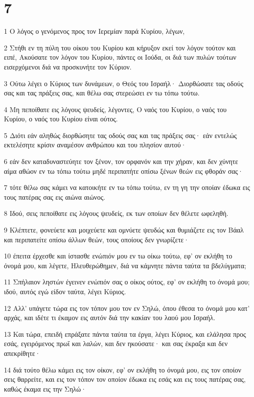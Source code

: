\chapter{7}

\par 1 Ο λόγος ο γενόμενος προς τον Ιερεμίαν παρά Κυρίου, λέγων,
\par 2 Στήθι εν τη πύλη του οίκου του Κυρίου και κήρυξον εκεί τον λόγον τούτον και ειπέ, Ακούσατε τον λόγον του Κυρίου, πάντες οι Ιούδα, οι διά των πυλών τούτων εισερχόμενοι διά να προσκυνήτε τον Κύριον.
\par 3 Ούτω λέγει ο Κύριος των δυνάμεων, ο Θεός του Ισραήλ· Διορθώσατε τας οδούς σας και τας πράξεις σας, και θέλω σας στερεώσει εν τω τόπω τούτω.
\par 4 Μη πεποίθατε εις λόγους ψευδείς, λέγοντες, Ο ναός του Κυρίου, ο ναός του Κυρίου, ο ναός του Κυρίου είναι ούτος.
\par 5 Διότι εάν αληθώς διορθώσητε τας οδούς σας και τας πράξεις σας· εάν εντελώς εκτελέσητε κρίσιν αναμέσον ανθρώπου και του πλησίον αυτού·
\par 6 εάν δεν καταδυναστεύητε τον ξένον, τον ορφανόν και την χήραν, και δεν χύνητε αίμα αθώον εν τω τόπω τούτω μηδέ περιπατήτε οπίσω ξένων θεών εις φθοράν σας·
\par 7 τότε θέλω σας κάμει να κατοικήτε εν τω τόπω τούτω, εν τη γη την οποίαν έδωκα εις τους πατέρας σας εις αιώνα αιώνος.
\par 8 Ιδού, σεις πεποίθατε εις λόγους ψευδείς, εκ των οποίων δεν θέλετε ωφεληθή.
\par 9 Κλέπτετε, φονεύετε και μοιχεύετε και ομνύετε ψευδώς και θυμιάζετε εις τον Βάαλ και περιπατείτε οπίσω άλλων θεών, τους οποίους δεν γνωρίζετε·
\par 10 έπειτα έρχεσθε και ίστασθε ενώπιόν μου εν τω οίκω τούτω, εφ' ον εκλήθη το όνομά μου, και λέγετε, Ηλευθερώθημεν, διά να κάμνητε πάντα ταύτα τα βδελύγματα;
\par 11 Σπήλαιον ληστών έγεινεν ενώπιόν σας ο οίκος ούτος, εφ' ον εκλήθη το όνομά μου; ιδού, αυτός εγώ είδον ταύτα, λέγει Κύριος.
\par 12 Αλλ' υπάγετε τώρα εις τον τόπον μου τον εν Σηλώ, όπου έθεσα το όνομά μου κατ' αρχάς, και ιδέτε τι έκαμον εις αυτόν διά την κακίαν του λαού μου Ισραήλ.
\par 13 Και τώρα, επειδή επράξατε πάντα ταύτα τα έργα, λέγει Κύριος, και ελάλησα προς εσάς, εγειρόμενος πρωΐ και λαλών, και δεν ηκούσατε· και σας έκραξα και δεν απεκρίθητε·
\par 14 διά τούτο θέλω κάμει εις τον οίκον, εφ' ον εκλήθη το όνομά μου, εις τον οποίον σεις θαρρείτε, και εις τον τόπον τον οποίον έδωκα εις εσάς και εις τους πατέρας σας, καθώς έκαμα εις την Σηλώ·
